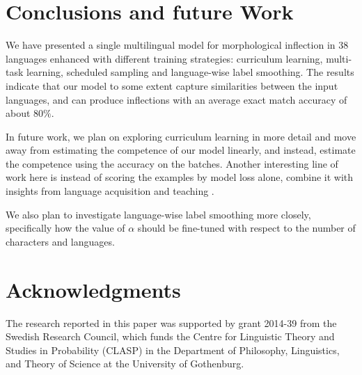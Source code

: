 \documentclass[11pt,a4paper]{article}
\begin{document}

\section{Conclusions and future Work}

We have presented a single multilingual model for morphological
inflection in $38$ languages enhanced with different training
strategies: curriculum learning, multi-task learning, scheduled
sampling and language-wise label smoothing.  
The results indicate that our model to some extent capture
similarities between the input languages, and can produce
inflections with an average exact match accuracy of about $80\%$. 

In future work, we plan on exploring curriculum learning in more detail
and move away from estimating the competence of our model linearly,
and instead, estimate the competence using the accuracy on the
batches. Another interesting line of work here is instead of scoring
the examples by model loss alone, combine it with insights from
language acquisition and teaching \cite{ionin2002easier,
slabakova2010easy}.

We also plan to investigate language-wise label smoothing more
closely, specifically how the value of $\alpha$ should be fine-tuned
with respect to the number of characters and languages.

\section*{Acknowledgments}

The research reported in this paper was supported by grant 2014-39
from the Swedish Research Council, which funds the Centre for
Linguistic Theory and Studies in Probability (CLASP) in the Department
of Philosophy, Linguistics, and Theory of Science at the University
of Gothenburg.

 



\end{document}
